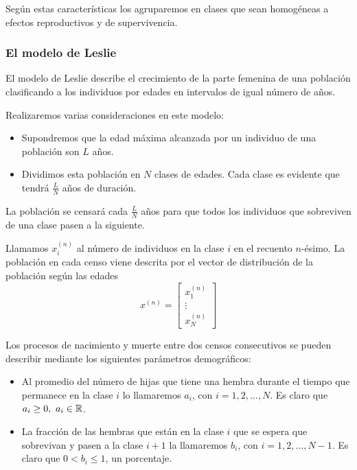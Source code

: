   Según estas características los agruparemos en clases que sean homogéneas a efectos reproductivos y de supervivencia.

    \subsubsection{El modelo de Leslie}
    \label{ssub:el_modelo_de_leslie}

El modelo de Leslie describe el crecimiento de la parte femenina de una población clasificando a los individuos por edades en intervalos de igual número de años.

    Realizaremos varias consideraciones en este modelo: \begin{itemize}
        \item Supondremos que la edad máxima alcanzada por un individuo de una población son $L$ años.
        \item Dividimos esta población en $N$ clases de edades. Cada clase es evidente que tendrá $\frac{L}{N}$ años de duración.
    \end{itemize}

    La población se censará cada $\frac{L}{N}$ años para que todos los individuos que sobreviven de una clase pasen a la siguiente.

    Llamamos $x_i^{(n)}$ al número de individuos en la clase $i$ en el recuento $n$-ésimo.
    La población en cada censo viene descrita por el vector de distribución de la población según las edades $$x^{(n)} = \begin{bmatrix}
        x_1^{(n)} \\
        \vdots \\
        x_N^{(n)}
    \end{bmatrix}$$

    Los procesos de nacimiento y muerte entre dos censos consecutivos se pueden describir mediante los siguientes parámetros demográficos:
    \begin{itemize}
        \item Al promedio del número de hijas que tiene una hembra durante el tiempo que permanece en la clase $i$ lo llamaremos $a_i$, con $i = 1, 2, \hdots, N$. Es claro que $a_i \geq 0, \ a_i \in \mathbb{R}$.
        \item La fracción de las hembras que están en la clase $i$ que se espera que sobrevivan y pasen a la clase $i+1$ la llamaremos $b_i$, con $i = 1, 2, \hdots, N-1$. Es claro que $0 < b_i \leq 1$, un porcentaje.
    \end{itemize}

